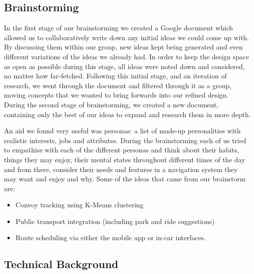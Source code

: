 \documentclass{article}
\begin{document}
\subsection{Brainstorming}\label{ssec:nav-brainstorming} %
In the first stage of our brainstorming we created a Google document which allowed us to collaboratively write down any initial ideas we could come up with. By discussing them within our group, new ideas kept being generated and even different variations of the ideas we already had. In order to keep the design space as open as possible  during this stage, all ideas were noted down and considered, no matter how far-fetched. Following this initial stage, and an iteration of research, we went through the document and filtered through it as a group, moving concepts that we wanted to bring forwards into our refined design. During the second stage of brainstorming, we created a new document, containing only the best of our ideas to expand and research them in more depth.

An aid we found very useful was personas: a list of made-up personalities with realistic interests, jobs and attributes. During the brainstorming each of us tried to empathise with each of the different personas and think about their habits, things they may enjoy, their mental states throughout different times of the day and from there, consider their needs and features in a navigation system they may want and enjoy and why.
Some of the ideas that came from our brainstorm are: 
\begin{itemize}
	\item Convoy tracking using K-Means clustering
    \item Public transport integration (including park and ride suggestions)
    \item Route scheduling via either the mobile app or in-car interfaces.
\end{itemize}

\subsection{Technical Background}\label{ssec:nav-tech}
\end{document}
